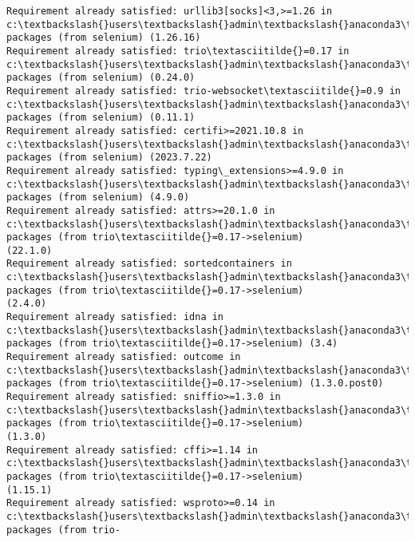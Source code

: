 \documentclass[11pt]{article}
\begin{document}
\begin{Verbatim}[commandchars=\\\{\}]
Requirement already satisfied: urllib3[socks]<3,>=1.26 in
c:\textbackslash{}users\textbackslash{}admin\textbackslash{}anaconda3\textbackslash{}ana\textbackslash{}lib\textbackslash{}site-packages (from selenium) (1.26.16)
Requirement already satisfied: trio\textasciitilde{}=0.17 in
c:\textbackslash{}users\textbackslash{}admin\textbackslash{}anaconda3\textbackslash{}ana\textbackslash{}lib\textbackslash{}site-packages (from selenium) (0.24.0)
Requirement already satisfied: trio-websocket\textasciitilde{}=0.9 in
c:\textbackslash{}users\textbackslash{}admin\textbackslash{}anaconda3\textbackslash{}ana\textbackslash{}lib\textbackslash{}site-packages (from selenium) (0.11.1)
Requirement already satisfied: certifi>=2021.10.8 in
c:\textbackslash{}users\textbackslash{}admin\textbackslash{}anaconda3\textbackslash{}ana\textbackslash{}lib\textbackslash{}site-packages (from selenium) (2023.7.22)
Requirement already satisfied: typing\_extensions>=4.9.0 in
c:\textbackslash{}users\textbackslash{}admin\textbackslash{}anaconda3\textbackslash{}ana\textbackslash{}lib\textbackslash{}site-packages (from selenium) (4.9.0)
Requirement already satisfied: attrs>=20.1.0 in
c:\textbackslash{}users\textbackslash{}admin\textbackslash{}anaconda3\textbackslash{}ana\textbackslash{}lib\textbackslash{}site-packages (from trio\textasciitilde{}=0.17->selenium)
(22.1.0)
Requirement already satisfied: sortedcontainers in
c:\textbackslash{}users\textbackslash{}admin\textbackslash{}anaconda3\textbackslash{}ana\textbackslash{}lib\textbackslash{}site-packages (from trio\textasciitilde{}=0.17->selenium)
(2.4.0)
Requirement already satisfied: idna in c:\textbackslash{}users\textbackslash{}admin\textbackslash{}anaconda3\textbackslash{}ana\textbackslash{}lib\textbackslash{}site-
packages (from trio\textasciitilde{}=0.17->selenium) (3.4)
Requirement already satisfied: outcome in c:\textbackslash{}users\textbackslash{}admin\textbackslash{}anaconda3\textbackslash{}ana\textbackslash{}lib\textbackslash{}site-
packages (from trio\textasciitilde{}=0.17->selenium) (1.3.0.post0)
Requirement already satisfied: sniffio>=1.3.0 in
c:\textbackslash{}users\textbackslash{}admin\textbackslash{}anaconda3\textbackslash{}ana\textbackslash{}lib\textbackslash{}site-packages (from trio\textasciitilde{}=0.17->selenium)
(1.3.0)
Requirement already satisfied: cffi>=1.14 in
c:\textbackslash{}users\textbackslash{}admin\textbackslash{}anaconda3\textbackslash{}ana\textbackslash{}lib\textbackslash{}site-packages (from trio\textasciitilde{}=0.17->selenium)
(1.15.1)
Requirement already satisfied: wsproto>=0.14 in
c:\textbackslash{}users\textbackslash{}admin\textbackslash{}anaconda3\textbackslash{}ana\textbackslash{}lib\textbackslash{}site-packages (from trio-

\end{Verbatim}
\end{document}
